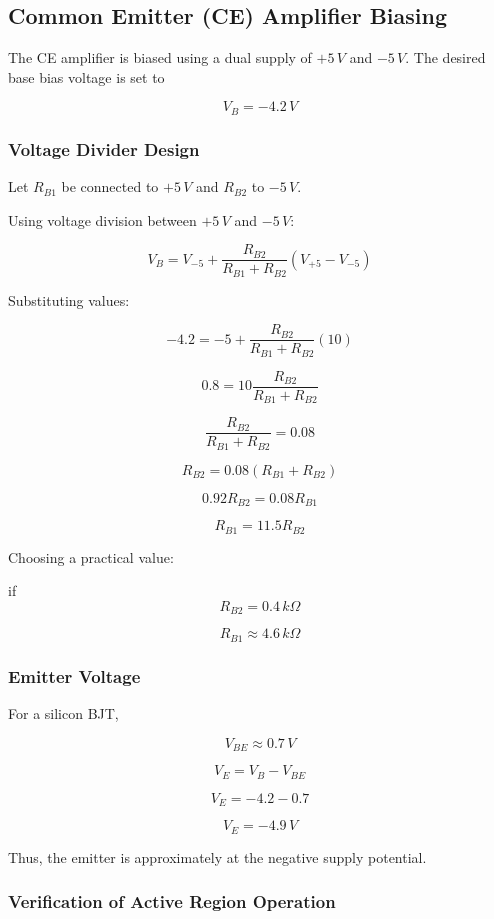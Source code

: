 \documentclass[10pt,twocolumn]{article}
\begin{document}
\subsection{Common Emitter (CE) Amplifier Biasing}

The CE amplifier is biased using a dual supply of $+5\,V$ and $-5\,V$. 
The desired base bias voltage is set to

\[
V_B = -4.2\,V
\]

\subsubsection*{Voltage Divider Design}

Let $R_{B1}$ be connected to $+5\,V$ and $R_{B2}$ to $-5\,V$.

Using voltage division between $+5\,V$ and $-5\,V$:

\[
V_B = V_{-5} + \frac{R_{B2}}{R_{B1}+R_{B2}} (V_{+5}-V_{-5})
\]

Substituting values:

\[
-4.2 = -5 + \frac{R_{B2}}{R_{B1}+R_{B2}} (10)
\]

\[
0.8 = 10 \frac{R_{B2}}{R_{B1}+R_{B2}}
\]

\[
\frac{R_{B2}}{R_{B1}+R_{B2}} = 0.08
\]

\[
R_{B2} = 0.08 (R_{B1}+R_{B2})
\]

\[
0.92 R_{B2} = 0.08 R_{B1}
\]

\[
R_{B1} = 11.5 R_{B2}
\]

Choosing a practical value:

if \[
R_{B2} = 0.4\,k\Omega
\]

\[
R_{B1} \approx 4.6\,k\Omega
\]


\subsubsection*{Emitter Voltage}

For a silicon BJT,

\[
V_{BE} \approx 0.7\,V
\]

\[
V_E = V_B - V_{BE}
\]

\[
V_E = -4.2 - 0.7
\]

\[
V_E = -4.9\,V
\]

Thus, the emitter is approximately at the negative supply potential.

\subsubsection*{Verification of Active Region Operation}
\end{document}
